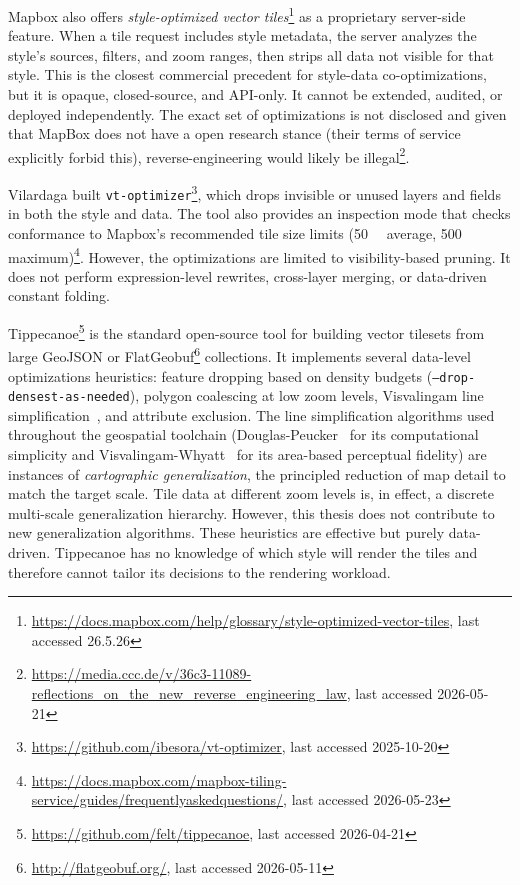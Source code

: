 Mapbox also offers \emph{style-optimized vector tiles}\footnote{\url{https://docs.mapbox.com/help/glossary/style-optimized-vector-tiles}, last accessed 26.5.26} as a proprietary server-side feature.
When a tile request includes style metadata, the server analyzes the style's sources, filters, and zoom ranges, then strips all data not visible for that style.
This is the closest commercial precedent for style-data co-optimizations, but it is opaque, closed-source, and \ac{API}-only.
It cannot be extended, audited, or deployed independently.
The exact set of optimizations is not disclosed and given that MapBox does not have a open research stance (their terms of service explicitly forbid this), reverse-engineering would likely be illegal\footnote{\url{https://media.ccc.de/v/36c3-11089-reflections_on_the_new_reverse_engineering_law}, last accessed 2026-05-21}.

Vilardaga built \texttt{vt-optimizer}\footnote{\url{https://github.com/ibesora/vt-optimizer}, last accessed 2025-10-20}, which drops invisible or unused layers and fields in both the style and data.
The tool also provides an inspection mode that checks conformance to Mapbox's recommended tile size limits (\qty{50}{\kilo\byte} average, \qty{500}{\kilo\byte} maximum)\footnote{\url{https://docs.mapbox.com/mapbox-tiling-service/guides/frequentlyaskedquestions/}, last accessed 2026-05-23}.
However, the optimizations are limited to visibility-based pruning.
It does not perform expression-level rewrites, cross-layer merging, or data-driven constant folding.

Tippecanoe\footnote{\url{https://github.com/felt/tippecanoe}, last accessed 2026-04-21} is the standard open-source tool for building vector tilesets from large \ac{GeoJSON} or FlatGeobuf\footnote{\url{http://flatgeobuf.org/}, last accessed 2026-05-11} collections.
It implements several data-level optimizations heuristics: feature dropping based on density budgets (\texttt{--drop-densest-as-needed}), polygon coalescing at low zoom levels, Visvalingam line simplification~\cite{visvalingamLineGeneralisationRepeated1993}, and attribute exclusion.
The line simplification algorithms used throughout the geospatial toolchain (Douglas-Peucker~\cite{douglasALGORITHMSREDUCTIONNUMBER1973} for its computational simplicity and Visvalingam-Whyatt~\cite{visvalingamLineGeneralisationRepeated1993} for its area-based perceptual fidelity) are instances of \emph{cartographic generalization}, the principled reduction of map detail to match the target scale.
Tile data at different zoom levels is, in effect, a discrete multi-scale generalization hierarchy.
However, this thesis does not contribute to new generalization algorithms.
These heuristics are effective but purely data-driven.
Tippecanoe has no knowledge of which style will render the tiles and therefore cannot tailor its decisions to the rendering workload.

